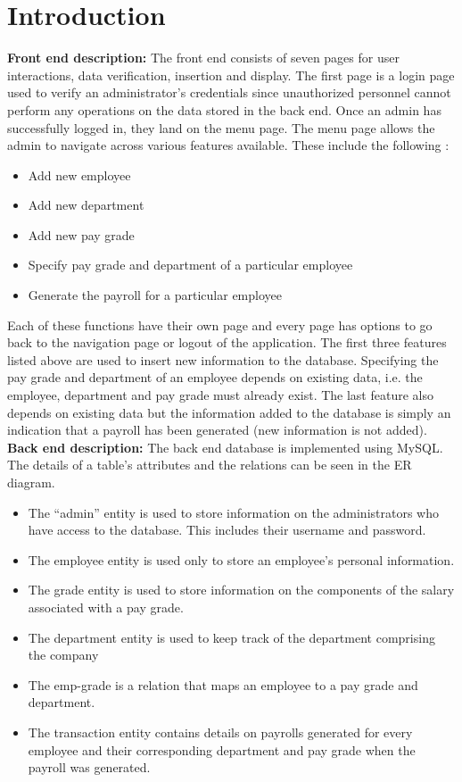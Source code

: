 \documentclass[12pt]{article}
\begin{document}
\section{Introduction}  %
\textbf{Front end description:}
\newline
\newline
The front end consists of seven pages for user interactions, data verification, insertion and display. The first page is a login page used to verify an administrator's credentials since unauthorized personnel cannot perform any operations on the data stored in the back end. Once an admin has successfully logged in, they land on the menu page.
\newline
\newline
The menu page allows the admin to navigate across various features available. These include the following :
\begin{itemize}
    \item Add new employee
    \item Add new department
    \item Add new pay grade
    \item Specify pay grade and department of a particular employee
    \item Generate the payroll for a particular employee
\end{itemize}
Each of these functions have their own page and every page has options to go back to the navigation page or logout of the application.
\newline
\newline
The first three features listed above are used to insert new information to the database. Specifying the pay grade and department of an employee depends on existing data, i.e. the employee, department and pay grade must already exist. The last feature also depends on existing data but the information added to the database is simply an indication that a payroll has been generated (new information is not added).
\newpage
\noindent
\textbf{Back end description:}
\newline
\newline
The back end database is implemented using MySQL. The details of a table's attributes and the relations can be seen in the ER diagram.
\begin{itemize}
    \item The “admin” entity is used to store information on the administrators who have access to the database. This includes their username and password.
    \item The employee entity is used only to store an employee’s personal information.
    \item The grade entity is used to store information on the components of the salary associated with a pay grade.
    \item The department entity is used to keep track of the department comprising the company
    \item The emp-grade is a relation that maps an employee to a pay grade and department.
    \item The transaction entity contains details on payrolls generated for every employee and their corresponding department and pay grade when the payroll was generated.
\end{itemize}
\end{document}
